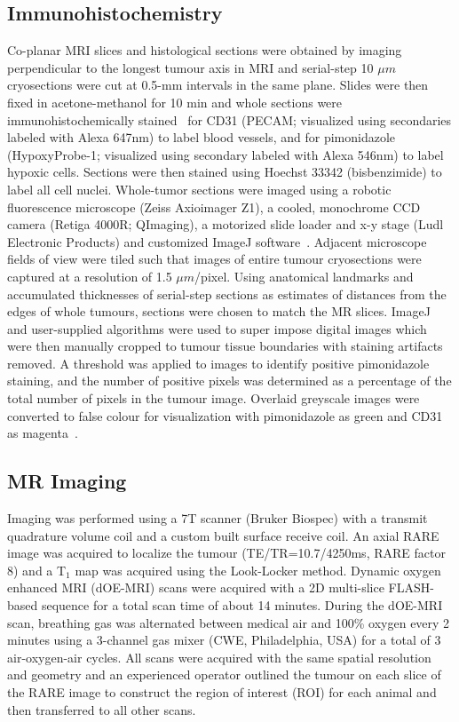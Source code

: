 \documentclass[num-refs]{wiley-article}
\begin{document}
\subsection{Immunohistochemistry}
Co-planar MRI slices and histological sections were obtained by imaging perpendicular to the longest tumour axis in MRI and serial-step 10 $\mu m$ cryosections were cut at 0.5-mm intervals in the same plane.
Slides were then fixed in acetone-methanol for 10 min and whole sections were immunohistochemically stained~\cite{Kalra:2017is} for CD31 (PECAM; visualized using secondaries labeled with Alexa 647nm) to label blood vessels, and for pimonidazole (HypoxyProbe-1; visualized using secondary labeled with Alexa 546nm) to label hypoxic cells. Sections were then stained using Hoechst 33342 (bisbenzimide) to label all cell nuclei.
Whole-tumor sections were imaged using a robotic fluorescence microscope (Zeiss Axioimager Z1), a cooled, monochrome CCD camera (Retiga 4000R; QImaging), a motorized slide loader and x-y stage (Ludl Electronic Products) and customized ImageJ software~\cite{Collins:2007jr}. 
Adjacent microscope fields of view were tiled such that images of entire tumour cryosections were captured at a resolution of 1.5 $\mu m$/pixel. 
Using anatomical landmarks and accumulated thicknesses of serial-step sections as estimates of distances from the edges of whole tumours, sections were chosen to match the MR slices. 
ImageJ and user-supplied algorithms were used to super impose digital images which were then manually cropped to tumour tissue boundaries with staining artifacts removed. 
A threshold was applied to images to identify positive pimonidazole staining, and the number of positive pixels was determined as a percentage of the total number of pixels in the tumour image. 
Overlaid greyscale images were converted to false colour for visualization with pimonidazole as green and CD31 as magenta~.

\subsection{MR Imaging}
Imaging was performed using a 7T scanner (Bruker Biospec) with a transmit quadrature volume coil and a custom built surface receive coil. 
An axial RARE image was acquired to localize the tumour (TE/TR=10.7/4250ms, RARE factor 8) and a T$_1$ map was acquired using the Look-Locker method.
Dynamic oxygen enhanced MRI (dOE-MRI) scans were acquired with a 2D multi-slice FLASH-based sequence for a total scan time of about 14 minutes.
During the dOE-MRI scan, breathing gas was alternated between medical air and 100\% oxygen every 2 minutes using a 3-channel gas mixer (CWE, Philadelphia, USA) for a total of 3 air-oxygen-air cycles.
All scans were acquired with the same spatial resolution and geometry and an experienced operator outlined the tumour on each slice of the RARE image to construct the region of interest (ROI) for each animal and then transferred to all other scans.
\end{document}
